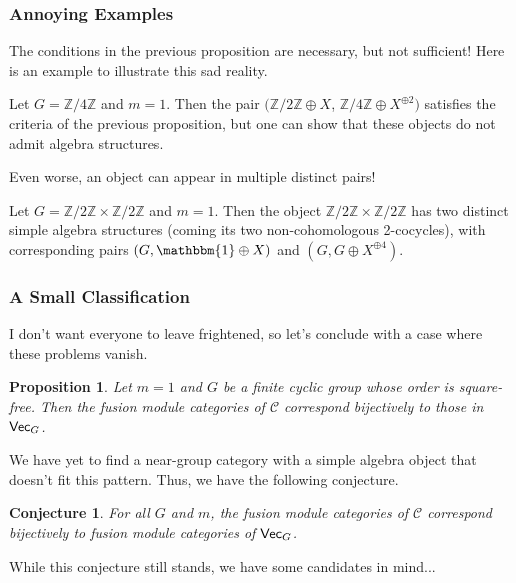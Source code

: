 \documentclass{beamer}
\theoremstyle{plain}
\newtheorem{proposition}[theorem]{Proposition}
\newtheorem{conjecture}[theorem]{Conjecture}
\theoremstyle{definition}
\DeclarePairedDelimiter{\abs}{\lvert}{\rvert}
\newcommand{\mathcat}[1]{\mathcal{#1}}
\newcommand{\textcat}[1]{\textup{\textsf{#1}}}
\begin{document}
\begin{frame}
\frametitle{Annoying Examples}
The conditions in the previous proposition are necessary, but not sufficient! Here is an example to illustrate this sad reality.
\begin{example}
Let $G = \mathbb{Z}/4\mathbb{Z}$ and $m = 1$. Then the pair $(\mathbb{Z}/2\mathbb{Z} \oplus X$, $\mathbb{Z}/4\mathbb{Z} \oplus X^{\oplus 2})$ satisfies the criteria of the previous proposition, but one can show that these objects do not admit algebra structures.
\end{example}
Even worse, an object can appear in multiple distinct pairs!
\begin{example}
Let $G = \mathbb{Z}/2\mathbb{Z} \times \mathbb{Z}/2\mathbb{Z}$ and $m = 1$. Then the object $\mathbb{Z}/2\mathbb{Z} \times \mathbb{Z}/2\mathbb{Z}$ has two distinct simple algebra structures (coming its two non-cohomologous 2-cocycles), with corresponding pairs $(G, \mathbbm{1} \oplus X)$ and $(G, G \oplus X^{\oplus 4})$.
\end{example}
\end{frame}

\begin{frame}
\frametitle{A Small Classification}
I don't want everyone to leave frightened, so let's conclude with a case where these problems vanish.
\begin{proposition}
Let $m = 1$ and $G$ be a finite cyclic group whose order is square-free. Then the fusion module categories of $\mathcat{C}$ correspond bijectively to those in $\textcat{Vec}_G$.
\end{proposition}
We have yet to find a near-group category with a simple algebra object that doesn't fit this pattern. Thus, we have the following conjecture.
\begin{conjecture}
For all $G$ and $m$, the fusion module categories of $\mathcat{C}$ correspond bijectively to fusion module categories of $\textcat{Vec}_G$.
\end{conjecture}
While this conjecture still stands, we have some candidates in mind...
\end{frame}

\end{document}

